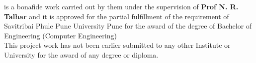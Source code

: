 \noindent
is a bonafide work carried out by them under the supervision of \textbf{Prof N. R. Talhar} and it is approved for the partial fulfillment of the requirement of Savitribai Phule Pune University Pune for the award of the degree of Bachelor of Engineering (Computer Engineering) \\

\noindent
This project work has not been earlier submitted to any other Institute or University for the award of any degree or diploma.
